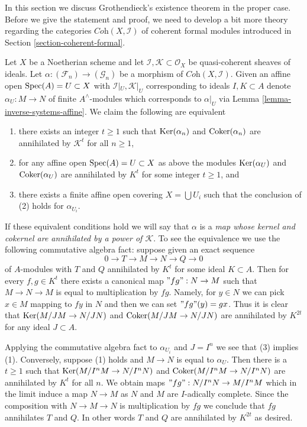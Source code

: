 \noindent
In this section we discuss Grothendieck's existence theorem in the proper case.
Before we give the statement and proof, we need to develop a bit
more theory regarding the categories $\textit{Coh}(X, \mathcal{I})$
of coherent formal modules
introduced in Section \ref{section-coherent-formal}.

\begin{remark}
\label{remark-inverse-systems-kernel-cokernel-annihilated-by}
Let $X$ be a Noetherian scheme and let
$\mathcal{I}, \mathcal{K} \subset \mathcal{O}_X$
be quasi-coherent sheaves of ideals. Let
$\alpha : (\mathcal{F}_n) \to (\mathcal{G}_n)$ be a morphism of
$\textit{Coh}(X, \mathcal{I})$.
Given an affine open $\mathop{\mathrm{Spec}}(A) = U \subset X$ with
$\mathcal{I}|_U, \mathcal{K}|_U$ corresponding to ideals $I, K \subset A$
denote $\alpha_U : M \to N$ of finite $A^\wedge$-modules which
corresponds to $\alpha|_U$ via Lemma \ref{lemma-inverse-systems-affine}.
We claim the following are equivalent
\begin{enumerate}
\item there exists an integer $t \geq 1$ such that
$\mathop{\mathrm{Ker}}(\alpha_n)$ and $\mathop{\mathrm{Coker}}(\alpha_n)$
are annihilated by $\mathcal{K}^t$ for all $n \geq 1$,
\item for any affine open $\mathop{\mathrm{Spec}}(A) = U \subset X$ as above
the modules $\mathop{\mathrm{Ker}}(\alpha_U)$ and $\mathop{\mathrm{Coker}}(\alpha_U)$
are annihilated by $K^t$ for some integer $t \geq 1$, and
\item there exists a finite affine open covering $X = \bigcup U_i$
such that the conclusion of (2) holds for $\alpha_{U_i}$.
\end{enumerate}
If these equivalent conditions hold we will say that
$\alpha$ is a
{\it map whose kernel and cokernel are annihilated by a power of
$\mathcal{K}$}.
To see the equivalence we use the following commutative algebra fact:
suppose given an exact sequence
$$
0 \to T \to M \to N \to Q \to 0
$$
of $A$-modules with $T$ and $Q$ annihilated by $K^t$ for some
ideal $K \subset A$. Then for every $f, g \in K^t$ there exists a
canonical map $"fg": N \to M$ such that $M \to N \to M$ is equal to
multiplication by $fg$. Namely, for $y \in N$ we can pick $x \in M$
mapping to $fy$ in $N$ and then we can set $"fg"(y) = gx$. Thus it is
clear that $\mathop{\mathrm{Ker}}(M/JM \to N/JN)$ and $\mathop{\mathrm{Coker}}(M/JM \to N/JN)$
are annihilated by $K^{2t}$ for any ideal $J \subset A$.

\medskip\noindent
Applying the commutative algebra fact to $\alpha_{U_i}$ and $J = I^n$
we see that (3) implies (1). Conversely,
suppose (1) holds and $M \to N$ is equal to $\alpha_U$. Then there is
a $t \geq 1$ such that
$\mathop{\mathrm{Ker}}(M/I^nM \to N/I^nN)$ and $\mathop{\mathrm{Coker}}(M/I^nM \to N/I^nN)$
are annihilated by $K^t$ for all $n$. We obtain maps
$"fg" : N/I^nN \to M/I^nM$ which in the limit induce a map $N \to M$
as $N$ and $M$ are $I$-adically complete. Since the composition with
$N \to M \to N$ is multiplication by $fg$ we conclude that $fg$
annihilates $T$ and $Q$. In other words $T$ and $Q$ are annihilated by
$K^{2t}$ as desired.
\end{remark}

